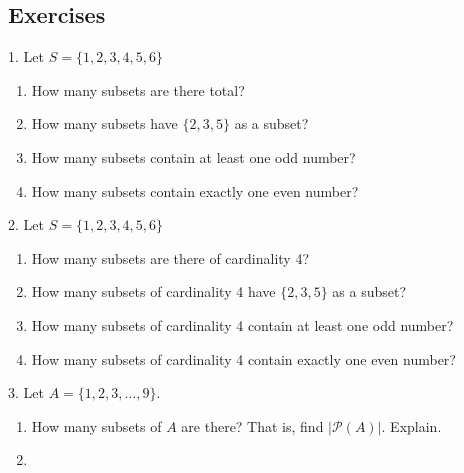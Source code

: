 \documentclass[12pt,]{book}
\theoremstyle{plain}
\theoremstyle{definition}
\theoremstyle{definition}
\theoremstyle{definition}
\numberwithin{equation}{chapter}
\newcommand{\pow}{\mathcal P}
\begin{document}
\subsection*{Exercises}\label{exercises_counting-binom}
\begin{exerciselist}
\item[1.]\hypertarget{exercise-102}{}\hypertarget{p-865}{}%
Let \(S = \{1, 2, 3, 4, 5, 6\}\) \leavevmode%
\begin{enumerate}[label=(\alph*)]
\item\hypertarget{li-392}{}\hypertarget{p-866}{}%
How many subsets are there total?%
\item\hypertarget{li-393}{}\hypertarget{p-867}{}%
How many subsets have \(\{2,3,5\}\) as a subset?%
\item\hypertarget{li-394}{}\hypertarget{p-868}{}%
How many subsets contain at least one odd number?%
\item\hypertarget{li-395}{}\hypertarget{p-869}{}%
How many subsets contain exactly one even number?%
\end{enumerate}
%
\par\smallskip
\item[2.]\hypertarget{exercise-103}{}\hypertarget{p-871}{}%
Let \(S = \{1, 2, 3, 4, 5, 6\}\) \leavevmode%
\begin{enumerate}[label=(\alph*)]
\item\hypertarget{li-400}{}\hypertarget{p-872}{}%
How many subsets are there of cardinality 4?%
\item\hypertarget{li-401}{}\hypertarget{p-873}{}%
How many subsets of cardinality 4 have \(\{2,3,5\}\) as a subset?%
\item\hypertarget{li-402}{}\hypertarget{p-874}{}%
How many subsets of cardinality 4 contain at least one odd number?%
\item\hypertarget{li-403}{}\hypertarget{p-875}{}%
How many subsets of cardinality 4 contain exactly one even number?%
\end{enumerate}
%
\par\smallskip
\item[3.]\hypertarget{exercise-104}{}\hypertarget{p-877}{}%
Let \(A = \{1,2,3,\ldots,9\}\). \leavevmode%
\begin{enumerate}[label=(\alph*)]
\item\hypertarget{li-408}{}\hypertarget{p-878}{}%
How many subsets of \(A\) are there? That is, find \(|\pow(A)|\). Explain. %
\item\hypertarget{li-409}{}\hypertarget{p-879}{}%

\end{enumerate}
\end{exerciselist}
\end{document}
